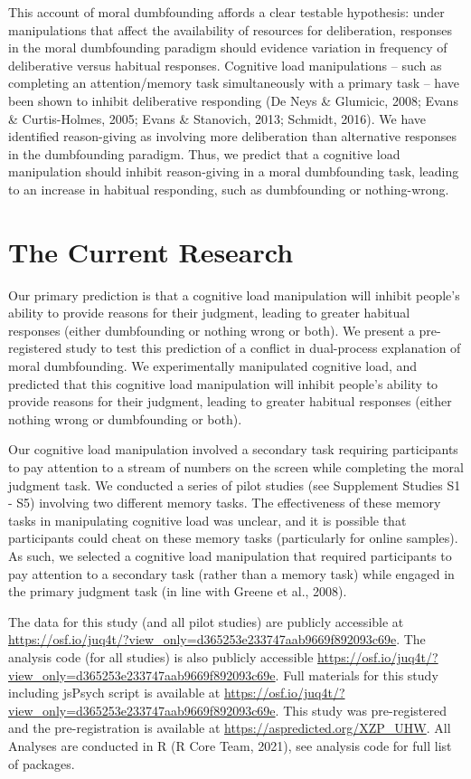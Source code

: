 \documentclass[
  american,
  man,floatsintext]{apa7}
\begin{document}
This account of moral dumbfounding affords a clear testable hypothesis: under manipulations that affect the availability of resources for deliberation, responses in the moral dumbfounding paradigm should evidence variation in frequency of deliberative versus habitual responses. Cognitive load manipulations -- such as completing an attention/memory task simultaneously with a primary task -- have been shown to inhibit deliberative responding (De Neys \& Glumicic, 2008; Evans \& Curtis-Holmes, 2005; Evans \& Stanovich, 2013; Schmidt, 2016). We have identified reason-giving as involving more deliberation than alternative responses in the dumbfounding paradigm. Thus, we predict that a cognitive load manipulation should inhibit reason-giving in a moral dumbfounding task, leading to an increase in habitual responding, such as dumbfounding or nothing-wrong.

\hypertarget{the-current-research}{%
\section{The Current Research}\label{the-current-research}}

Our primary prediction is that a cognitive load manipulation will inhibit people's ability to provide reasons for their judgment, leading to greater habitual responses (either dumbfounding or nothing wrong or both). We present a pre-registered study to test this prediction of a conflict in dual-process explanation of moral dumbfounding. We experimentally manipulated cognitive load, and predicted that this cognitive load manipulation will inhibit people's ability to provide reasons for their judgment, leading to greater habitual responses (either nothing wrong or dumbfounding or both).

Our cognitive load manipulation involved a secondary task requiring participants to pay attention to a stream of numbers on the screen while completing the moral judgment task. We conducted a series of pilot studies (see Supplement Studies S1 - S5) involving two different memory tasks. The effectiveness of these memory tasks in manipulating cognitive load was unclear, and it is possible that participants could cheat on these memory tasks (particularly for online samples). As such, we selected a cognitive load manipulation that required participants to pay attention to a secondary task (rather than a memory task) while engaged in the primary judgment task (in line with Greene et al., 2008).

The data for this study (and all pilot studies) are publicly accessible at \color{blue}\url{https://osf.io/juq4t/?view_only=d365253e233747aab9669f892093c69e}\color{black}. The analysis code (for all studies) is also publicly accessible \color{blue}\url{https://osf.io/juq4t/?view_only=d365253e233747aab9669f892093c69e}\color{black}. Full materials for this study including jsPsych script is available at \color{blue}\url{https://osf.io/juq4t/?view_only=d365253e233747aab9669f892093c69e}\color{black}. This study was pre-registered and the pre-registration is available at \color{blue}\url{https://aspredicted.org/XZP_UHW}\color{black}. All Analyses are conducted in R (R Core Team, 2021), see analysis code for full list of packages.
\end{document}
